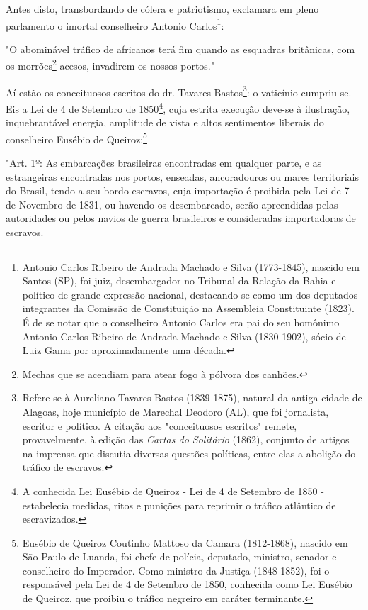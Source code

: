 Antes disto, transbordando de cólera e patriotismo, exclamara em pleno
parlamento o imortal conselheiro Antonio Carlos\footnote{Antonio
  Carlos Ribeiro de Andrada Machado e Silva (1773-1845), nascido em
  Santos (SP), foi juiz, desembargador no Tribunal da Relação da Bahia e
  político de grande expressão nacional, destacando-se como um dos
  deputados integrantes da Comissão de Constituição na Assembleia
  Constituinte (1823). É de se notar que o conselheiro Antonio Carlos
  era pai do seu homônimo Antonio Carlos Ribeiro de Andrada Machado e
  Silva (1830-1902), sócio de Luiz Gama por aproximadamente uma década.}:

"O abominável tráfico de africanos terá fim quando as esquadras
britânicas, com os morrões\footnote{Mechas que se acendiam para atear
  fogo à pólvora dos canhões.} acesos, invadirem os nossos portos."

Aí estão os conceituosos escritos do dr. Tavares Bastos\footnote{
  Refere-se à Aureliano Tavares Bastos (1839-1875), natural da antiga
  cidade de Alagoas, hoje município de Marechal Deodoro (AL), que foi
  jornalista, escritor e político. A citação aos "conceituosos escritos"
  remete, provavelmente, à edição das \emph{Cartas do Solitário} (1862),
  conjunto de artigos na imprensa que discutia diversas questões
  políticas, entre elas a abolição do tráfico de escravos.}: o vaticínio
cumpriu-se. Eis a Lei de 4 de Setembro de 1850\footnote{A conhecida
  Lei Eusébio de Queiroz - Lei de 4 de Setembro de 1850 - estabelecia
  medidas, ritos e punições para reprimir o tráfico atlântico de
  escravizados.}, cuja estrita execução deve-se à ilustração,
inquebrantável energia, amplitude de vista e altos sentimentos liberais
do conselheiro Eusébio de Queiroz:\footnote{Eusébio de Queiroz
  Coutinho Mattoso da Camara (1812-1868), nascido em São Paulo de
  Luanda, foi chefe de polícia, deputado, ministro, senador e
  conselheiro do Imperador. Como ministro da Justiça (1848-1852), foi o
  responsável pela Lei de 4 de Setembro de 1850, conhecida como Lei
  Eusébio de Queiroz, que proibiu o tráfico negreiro em caráter
  terminante.}

"Art. 1º: As embarcações brasileiras encontradas em qualquer parte, e as
estrangeiras encontradas nos portos, enseadas, ancoradouros ou mares
territoriais do Brasil, tendo a seu bordo escravos, cuja importação é
proibida pela Lei de 7 de Novembro de 1831, ou havendo-os desembarcado,
serão apreendidas pelas autoridades ou pelos navios de guerra
brasileiros e consideradas importadoras de escravos.

